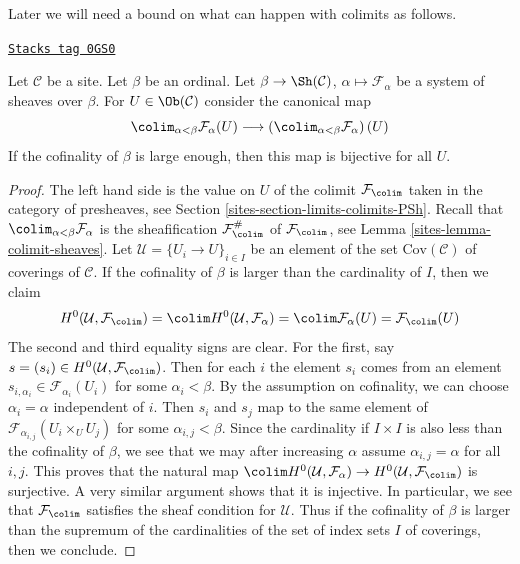 Later we will need a bound on what can happen with colimits as follows.

\begin{lemma}
\label{sites-lemma-colimit-over-ordinal-sections}
\href{https://stacks.math.columbia.edu/tag/0GS0}{\texttt{Stacks tag 0GS0}}

Let $\mathcal{C}$ be a site. Let $\beta$ be an ordinal.
Let $\beta \to \Sh(\mathcal{C})$, $\alpha \mapsto \mathcal{F}_\alpha$
be a system of sheaves over $\beta$. For $U \in \Ob(\mathcal{C})$
consider the canonical map
$$
\colim_{\alpha < \beta} \mathcal{F}_\alpha(U)
\longrightarrow
\left(\colim_{\alpha < \beta} \mathcal{F}_\alpha \right)(U)
$$
If the cofinality of $\beta$ is large enough, then this map
is bijective for all $U$.
\end{lemma}

\begin{proof}

The left hand side is the value on $U$ of the colimit $\mathcal{F}_{\colim}$
taken in the category of presheaves, see
Section \ref{sites-section-limits-colimits-PSh}.
Recall that $\colim_{\alpha < \beta} \mathcal{F}_\alpha$ is the
sheafification $\mathcal{F}_{\colim}^\#$ of $\mathcal{F}_{\colim}$, see
Lemma \ref{sites-lemma-colimit-sheaves}.
Let $\mathcal{U} = \{U_i \to U\}_{i \in I}$ be an element of the
set $\text{Cov}(\mathcal{C})$ of coverings of $\mathcal{C}$.
If the cofinality of $\beta$ is larger than the
cardinality of $I$, then we claim
$$
H^0(\mathcal{U}, \mathcal{F}_{\colim}) =
\colim H^0(\mathcal{U}, \mathcal{F}_\alpha) =
\colim \mathcal{F}_\alpha(U) = \mathcal{F}_{\colim}(U)
$$
The second and third equality signs are clear. For the first, say
$s = (s_i) \in H^0(\mathcal{U}, \mathcal{F}_{\colim})$.
Then for each $i$ the element $s_i$ comes from an element
$s_{i, \alpha_i} \in \mathcal{F}_{\alpha_i}(U_i)$ for some
$\alpha_i < \beta$. By the assumption on cofinality, we can choose
$\alpha_i = \alpha$ independent of $i$. Then $s_i$ and $s_j$
map to the same element of $\mathcal{F}_{\alpha_{i, j}}(U_i \times_U U_j)$
for some $\alpha_{i, j} < \beta$. Since the cardinality if
$I \times I$ is also less than the cofinality of $\beta$, we see
that we may after increasing $\alpha$ assume $\alpha_{i, j} = \alpha$
for all $i, j$. This proves that the natural map
$\colim H^0(\mathcal{U}, \mathcal{F}_\alpha)
\to H^0(\mathcal{U}, \mathcal{F}_{\colim})$ is surjective.
A very similar argument shows that it is injective.
In particular, we see that $\mathcal{F}_{\colim}$ satisfies
the sheaf condition for $\mathcal{U}$.
Thus if the cofinality of $\beta$ is larger than the
supremum of the cardinalities of the set of index sets $I$
of coverings, then we conclude.
\end{proof}


